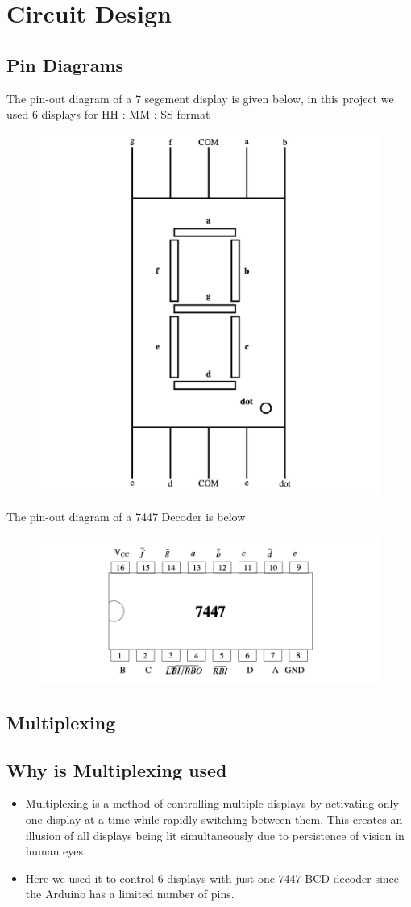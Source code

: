 \documentclass[journal]{IEEEtran}
\begin{document}
\section{Circuit Design}
\subsection{Pin Diagrams}
The pin-out diagram of a 7 segement display is given below, in this project we used 6 displays for HH : MM : SS format
\begin{figure}[H]
    \centering
    \includegraphics[width=0.3\linewidth]{figs/sevensegPinout.png}
\end{figure}
The pin-out diagram of a 7447 Decoder is below 
\begin{figure}[H]
    \centering
    \includegraphics[width=0.4\linewidth]{figs/pinout.png}
\end{figure}
\subsection{Multiplexing}
\subsection*{Why is Multiplexing used}
\begin{itemize}
    \item Multiplexing is a method of controlling multiple displays by activating only one display at a time while rapidly switching between them. This creates an illusion of all displays being lit simultaneously due to persistence of vision in human eyes.
    \item Here we used it to control 6 displays with just one 7447 BCD decoder since the Arduino has a limited number of pins.
\end{itemize}
\end{document}

